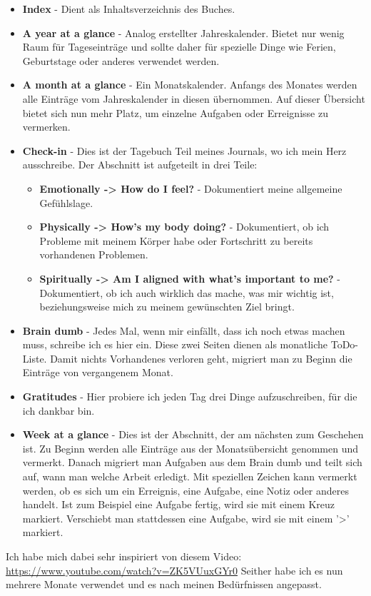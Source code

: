 \begin{itemize}
  \item \textbf{Index} - Dient als Inhaltsverzeichnis des Buches.
  \item \textbf{A year at a glance} - Analog erstellter Jahreskalender. Bietet nur wenig Raum für Tageseinträge und sollte daher für spezielle Dinge wie Ferien, Geburtstage oder anderes verwendet werden.
  \item \textbf{A month at a glance} - Ein Monatskalender. Anfangs des Monates werden alle Einträge vom Jahreskalender in diesen übernommen. Auf dieser Übersicht bietet sich nun mehr Platz, um einzelne Aufgaben oder Erreignisse zu vermerken.
  \item \textbf{Check-in} - Dies ist der Tagebuch Teil meines Journals, wo ich mein Herz ausschreibe. Der Abschnitt ist aufgeteilt in drei Teile:
  \begin{itemize}
    \item \textbf{Emotionally -> How do I feel?} - Dokumentiert meine allgemeine Gefühlslage.
    \item \textbf{Physically -> How's my body doing?} - Dokumentiert, ob ich Probleme mit meinem Körper habe oder Fortschritt zu bereits vorhandenen Problemen.
    \item \textbf{Spiritually -> Am I aligned with what's important to me?} - Dokumentiert, ob ich auch wirklich das mache, was mir wichtig ist, beziehungsweise mich zu meinem gewünschten Ziel bringt.
  \end{itemize}
  \item \textbf{Brain dumb} - Jedes Mal, wenn mir einfällt, dass ich noch etwas machen muss, schreibe ich es hier ein. Diese zwei Seiten dienen als monatliche ToDo-Liste. Damit nichts Vorhandenes verloren geht, migriert man zu Beginn die Einträge von vergangenem Monat.
  \item \textbf{Gratitudes} - Hier probiere ich jeden Tag drei Dinge aufzuschreiben, für die ich dankbar bin.
  \item \textbf{Week at a glance} - Dies ist der Abschnitt, der am nächsten zum Geschehen ist. Zu Beginn werden alle Einträge aus der Monatsübersicht genommen und vermerkt. Danach migriert man Aufgaben aus dem Brain dumb und teilt sich auf, wann man welche Arbeit erledigt. Mit speziellen Zeichen kann vermerkt werden, ob es sich um ein Erreignis, eine Aufgabe, eine Notiz oder anderes handelt. Ist zum Beispiel eine Aufgabe fertig, wird sie mit einem Kreuz markiert. Verschiebt man stattdessen eine Aufgabe, wird sie mit einem '>' markiert.
\end{itemize}
Ich habe mich dabei sehr inspiriert von diesem Video:
\newline
\url{https://www.youtube.com/watch?v=ZK5VUuxGYr0}
\newline
Seither habe ich es nun mehrere Monate verwendet und es nach meinen Bedürfnissen angepasst.
